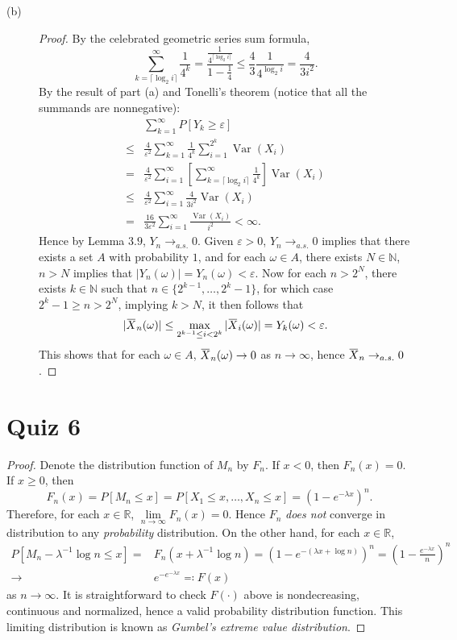 \documentclass{article}
\newcommand{\eps}{\varepsilon}
\newcommand{\real}{\mathbb{R}}
\newcommand{\nn}{\mathbb{N}}
\newcommand{\overbar}[1]{\mkern 1.5mu\overline{\mkern-1.5mu#1\mkern-1.5mu}\mkern 1.5mu}
\DeclareMathOperator*{\Var}{Var}
\theoremstyle{definition}
\theoremstyle{plain}
\theoremstyle{remark}
\begin{document}
\begin{description}
\begin{description}
\item[(b)]
\begin{proof}
By the celebrated geometric series sum formula,
$$\sum_{k = \lceil \log_2 i\rceil}^\infty \frac{1}{4^k} = \frac{\frac{1}{4^{\lceil \log_2 i \rceil}}}{1 - \frac{1}{4}} \leq \frac{4}{3}\frac{1}{4^{\log_2 i}} = \frac{4}{3i^2}.$$
By the result of part (a) and Tonelli's theorem (notice that all the summands are nonnegative):
\begin{align*}
& \sum_{k = 1}^\infty P[Y_k \geq \eps] \\
\leq & \frac{4}{\eps^2} \sum_{k = 1}^\infty \frac{1}{4^k}\sum_{i = 1}^{2^k} \Var(X_i) \\
= & \frac{4}{\eps^2} \sum_{i = 1}^\infty \left[\sum_{k = \lceil \log_2 i \rceil}^\infty \frac{1}{4^k}\right] \Var(X_i) \\
\leq & \frac{4}{\eps^2} \sum_{i = 1}^\infty \frac{4}{3i^2}\Var(X_i) \\
= & \frac{16}{3\eps^2} \sum_{i = 1}^\infty \frac{\Var(X_i)}{i^2} < \infty.
\end{align*}
Hence by Lemma $3.9$, $Y_n \to_{a.s.} 0$. Given $\eps > 0$, $Y_n \to_{a.s.} 0$ implies that there exists a set $A$ with probability $1$, and for each $\omega \in A$, there exists $N \in \nn$, $n > N$ implies that $|Y_n(\omega)| = Y_n(\omega) < \eps$. Now for each $n > 2^{N}$, there exists $k \in \nn$ such that $n \in \{2^{k - 1}, \ldots, 2^k - 1\}$,  for which case $2^k - 1 \geq n > 2^N$, implying $k > N$,  it then follows that
$$|\overbar{X}_n(\omega)| \leq \max_{2^{k - 1} \leq i < 2^k} |\overbar{X}_i(\omega)| = Y_k(\omega) < \eps. $$
This shows that for each $\omega \in A$, $\overbar{X}_n(\omega) \to 0$ as $n \to \infty$, hence $\overbar{X}_n \to_{a.s.} 0$. 
\end{proof}
\end{description}
\end{description}

\newpage

\section*{Quiz 6}
\begin{proof}
Denote the distribution function of $M_n$ by $F_n$. If $x < 0$, then $F_n(x) = 0$. If $x \geq 0$, then
$$F_n(x) = P[M_n \leq x] = P[X_1 \leq x, \ldots, X_n \leq x] = (1 - e^{-\lambda x})^n.$$
Therefore, for each $x \in \real$, $\lim\limits_{n \to \infty} F_n(x) = 0$. 
Hence $F_n$ \emph{does not} converge in distribution to any \emph{probability} 
distribution. On the other hand, for each $x \in \real$, 
\begin{align*}
P[M_n - \lambda^{-1}\log n \leq x] = & F_n(x + \lambda^{-1}\log n) = \left(1 - e^{-(\lambda x + \log n)}\right)^n = \left(1 - \frac{e^{-\lambda x}}{n}\right)^n \\
\to & e^{-e^{-\lambda x}} \eqqcolon F(x)
\end{align*}
as $n \to \infty$. It is straightforward to check $F(\cdot)$ above is 
nondecreasing, continuous and normalized, hence a valid probability 
distribution function. This limiting distribution is known as \emph{Gumbel's 
extreme value distribution}.
\end{proof}
\end{document}
